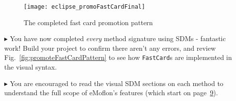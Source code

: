 \begin{itemize}
\newpage

\vspace*{1cm}

\begin{figure}[htp]
\begin{center}
  \texttt{[image: eclipse\_promoFastCardFinal]}
  \caption{The completed fast card promotion pattern}
  \label{fig:promoFastCardFinal}
\end{center}
\end{figure}

\vspace{0.5cm}

\item[$\blacktriangleright$] You have now completed \emph{every} method signature using SDMs - fantastic work! Build your project to
confirm there aren't any errors, and review Fig.~\ref{fig:promoteFastCardPattern} to see how \texttt{FastCard}s are implemented in the visual syntax.

\item[$\blacktriangleright$] You are encouraged to read the visual SDM sections on each method to understand the full scope of eMoflon's features (which start
on page~\hyperlink{Page.9}{9}). 
  
\end{itemize}
